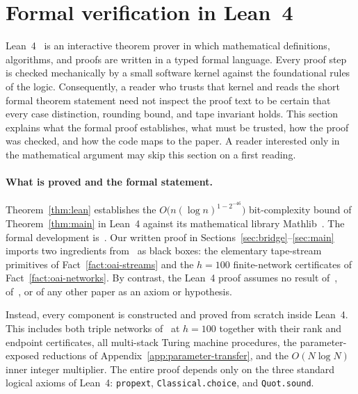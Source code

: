 \section{Formal verification in Lean~4}\label{sec:lean}\label{sec:prov-lean}

Lean~4~\cite{dMU21} is an interactive theorem prover in which mathematical definitions, algorithms, and proofs are written in a typed formal language. Every proof step is checked mechanically by a small software kernel against the foundational rules of the logic. Consequently, a reader who trusts that kernel and reads the short formal theorem statement need not inspect the proof text to be certain that every case distinction, rounding bound, and tape invariant holds. This section explains what the formal proof establishes, what must be trusted, how the proof was checked, and how the code maps to the paper. A reader interested only in the mathematical argument may skip this section on a first reading.

\paragraph{What is proved and the formal statement.}
Theorem~\ref{thm:lean} establishes the $O\bigl(n(\log n)^{1-2^{-46}}\bigr)$ bit-complexity bound of Theorem~\ref{thm:main} in Lean~4 against its mathematical library Mathlib~\cite{Mathlib20}. The formal development is~\cite{Lean26}. Our written proof in Sections~\ref{sec:bridge}--\ref{sec:main} imports two ingredients from~\cite{OAI26} as black boxes: the elementary tape-stream primitives of Fact~\ref{fact:oai-streams} and the $h=100$ finite-network certificates of Fact~\ref{fact:oai-networks}. By contrast, the Lean~4 proof assumes no result of~\cite{OAI26}, of~\cite{MS}, or of any other paper as an axiom or hypothesis.

Instead, every component is constructed and proved from scratch inside Lean~4. This includes both triple networks of~\cite[\S3]{OAI26} at $h=100$ together with their rank and endpoint certificates, all multi-stack Turing machine procedures, the parameter-exposed reductions of Appendix~\ref{app:parameter-transfer}, and the $O(N\log N)$ inner integer multiplier. The entire proof depends only on the three standard logical axioms of Lean~4: \texttt{propext}, \texttt{Classical.choice}, and \texttt{Quot.sound}.

